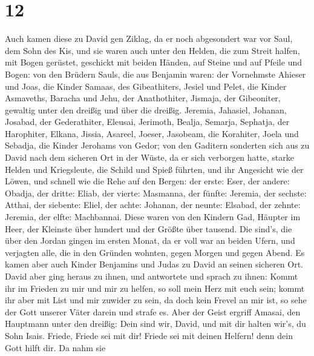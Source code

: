 \hypertarget{section-11}{%
\section{12}\label{section-11}}

 Auch kamen diese zu David gen Ziklag, da er noch
abgesondert war vor Saul, dem Sohn des Kis, und sie waren auch unter den
Helden, die zum Streit halfen,  mit Bogen gerüstet,
geschickt mit beiden Händen, auf Steine und auf Pfeile und Bogen: von
den Brüdern Sauls, die aus Benjamin waren:  der Vornehmste
Ahieser und Joas, die Kinder Samaas, des Gibeathiters, Jesiel und Pelet,
die Kinder Asmaveths, Baracha und Jehu, der Anathothiter, 
Jismaja, der Gibeoniter, gewaltig unter den dreißig und über die
dreißig.  Jeremia, Jahasiel, Johanan, Josabad, der
Gederathiter,  Eleusai, Jerimoth, Bealja, Semarja,
Sephatja, der Harophiter,  Elkana, Jissia, Asareel,
Joeser, Jasobeam, die Korahiter,  Joela und Sebadja, die
Kinder Jerohams von Gedor;  von den Gaditern sonderten
sich aus zu David nach dem sicheren Ort in der Wüste, da er sich
verborgen hatte, starke Helden und Kriegsleute, die Schild und Spieß
führten, und ihr Angesicht wie der Löwen, und schnell wie die Rehe auf
den Bergen:  der erste: Eser, der andere: Obadja, der
dritte: Eliab,  der vierte: Masmanna, der fünfte:
Jeremia,  der sechste: Atthai, der siebente: Eliel,
 der achte: Johanan, der neunte: Elsabad, 
der zehnte: Jeremia, der elfte: Machbannai.  Diese waren
von den Kindern Gad, Häupter im Heer, der Kleinste über hundert und der
Größte über tausend.  Die sind's, die über den Jordan
gingen im ersten Monat, da er voll war an beiden Ufern, und verjagten
alle, die in den Gründen wohnten, gegen Morgen und gegen Abend.
 Es kamen aber auch Kinder Benjamins und Judas zu David
an seinen sicheren Ort.  David aber ging heraus zu ihnen,
und antwortete und sprach zu ihnen: Kommt ihr im Frieden zu mir und mir
zu helfen, so soll mein Herz mit euch sein; kommt ihr aber mit List und
mir zuwider zu sein, da doch kein Frevel an mir ist, so sehe der Gott
unserer Väter darein und strafe es.  Aber der Geist
ergriff Amasai, den Hauptmann unter den dreißig: Dein sind wir, David,
und mit dir halten wir's, du Sohn Isais. Friede, Friede sei mit dir!
Friede sei mit deinen Helfern! denn dein Gott hilft dir. Da nahm sie
